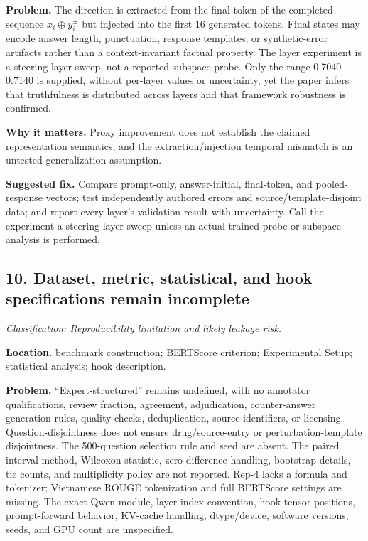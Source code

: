 \documentclass[11pt]{article}
\newcommand{\findinglabel}[1]{\textbf{#1}}
\newcommand{\classification}[1]{\textit{Classification: #1.}}
\begin{document}
\findinglabel{Problem.} The direction is extracted from the final token of the completed sequence $x_i\oplus y_i^{\pm}$ but injected into the first 16 generated tokens.  Final states may encode answer length, punctuation, response templates, or synthetic-error artifacts rather than a context-invariant factual property.  The layer experiment is a steering-layer sweep, not a reported subspace probe.  Only the range 0.7040--0.7140 is supplied, without per-layer values or uncertainty, yet the paper infers that truthfulness is distributed across layers and that framework robustness is confirmed.

\findinglabel{Why it matters.} Proxy improvement does not establish the claimed representation semantics, and the extraction/injection temporal mismatch is an untested generalization assumption.

\findinglabel{Suggested fix.} Compare prompt-only, answer-initial, final-token, and pooled-response vectors; test independently authored errors and source/template-disjoint data; and report every layer's validation result with uncertainty.  Call the experiment a steering-layer sweep unless an actual trained probe or subspace analysis is performed.

\subsection*{10. Dataset, metric, statistical, and hook specifications remain incomplete}

\classification{Reproducibility limitation and likely leakage risk}

\findinglabel{Location.} benchmark construction; BERTScore criterion; Experimental Setup; statistical analysis; hook description.

\findinglabel{Problem.} ``Expert-structured'' remains undefined, with no annotator qualifications, review fraction, agreement, adjudication, counter-answer generation rules, quality checks, deduplication, source identifiers, or licensing.  Question-disjointness does not ensure drug/source-entry or perturbation-template disjointness.  The 500-question selection rule and seed are absent.  The paired interval method, Wilcoxon statistic, zero-difference handling, bootstrap details, tie counts, and multiplicity policy are not reported.  Rep-4 lacks a formula and tokenizer; Vietnamese ROUGE tokenization and full BERTScore settings are missing.  The exact Qwen module, layer-index convention, hook tensor positions, prompt-forward behavior, KV-cache handling, dtype/device, software versions, seeds, and GPU count are unspecified.
\end{document}
